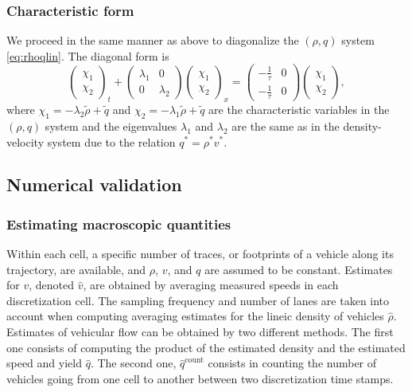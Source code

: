 \documentclass[letterpaper, 10 pt, conference]{ieeeconf}  %
\begin{document}
\subsubsection{Characteristic form}
We proceed in the same manner as above to diagonalize the $(\rho,q)$ system \eqref{eq:rhoqlin}. The diagonal form is
{\footnotesize
\begin{equation} \label{rhoqlindiag}
\begin{pmatrix}
	\chi_1 \\ 
	\chi_2
\end{pmatrix}_t 
+
\begin{pmatrix}
	\lambda_1 & 0 \\
	0 & \lambda_2
\end{pmatrix}
\begin{pmatrix}
	\chi_1 \\ 
	\chi_2
\end{pmatrix}_x
= 
\begin{pmatrix}
	-\frac{1}{\tau} & 0 \\
	-\frac{1}{\tau} & 0
\end{pmatrix}
\begin{pmatrix}
\chi_1 \\ \chi_2
\end{pmatrix},
\end{equation}
}
where $\chi_1 = -\lambda_2 \tilde{\rho} + \tilde{q}$ and $\chi_2 = -\lambda_1 \tilde{\rho} + \tilde{q}$ are the characteristic variables in the $(\rho,q)$ system and the eigenvalues $\lambda_1$ and $\lambda_2$ are the same as in the density-velocity system due to the relation $q^* = \rho^*v^*$.


\subsection{Numerical validation}

\subsubsection{Estimating macroscopic quantities}
Within each cell, a specific number of traces, or footprints of a vehicle along its trajectory, are available, and $\rho$, $v$, and $q$ are assumed to be constant. Estimates for $v$, denoted $\hat{v}$, are obtained by averaging measured speeds in each discretization cell. The sampling frequency and number of lanes are taken into account when computing averaging estimates for the lineic density of vehicles $\hat{\rho}$. Estimates of vehicular flow can be obtained by two different methods. The first one consists of computing the product of the estimated density and the estimated speed and yield $\hat{q}$. The second one, $\hat{q}^{\text{count}}$ consists in counting the number of vehicles going from one cell to another between two discretization time stamps.
\end{document}
